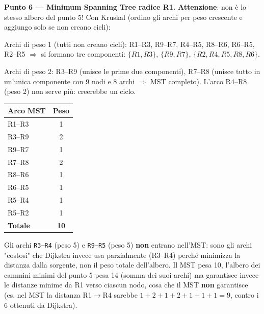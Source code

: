 \documentclass[12pt, a4paper]{article}
\begin{document}
\textbf{Punto 6 --- Minimum Spanning Tree radice R1.} \textbf{Attenzione}: non è lo stesso albero del punto 5! Con Kruskal (ordino gli archi per peso crescente e aggiungo solo se non creano cicli):

Archi di peso 1 (tutti non creano cicli): R1--R3, R9--R7, R4--R5, R8--R6, R6--R5, R2--R5 $\Rightarrow$ si formano tre componenti: $\{R1,R3\}$, $\{R9,R7\}$, $\{R2,R4,R5,R8,R6\}$.

Archi di peso 2: R3--R9 (unisce le prime due componenti), R7--R8 (unisce tutto in un'unica componente con 9 nodi e 8 archi $\Rightarrow$ MST completo). L'arco R4--R8 (peso 2) non serve più: creerebbe un ciclo.

\begin{center}
\begin{tabular}{|l|c|}
\hline
\textbf{Arco MST} & \textbf{Peso} \\
\hline
R1--R3 & 1 \\
R3--R9 & 2 \\
R9--R7 & 1 \\
R7--R8 & 2 \\
R8--R6 & 1 \\
R6--R5 & 1 \\
R5--R4 & 1 \\
R5--R2 & 1 \\
\hline
\textbf{Totale} & \textbf{10} \\
\hline
\end{tabular}
\end{center}

Gli archi \texttt{R3--R4} (peso 5) e \texttt{R9--R5} (peso 5) \textbf{non} entrano nell'MST: sono gli archi "costosi" che Dijkstra invece usa parzialmente (R3--R4) perché minimizza la distanza dalla sorgente, non il peso totale dell'albero. Il MST pesa 10, l'albero dei cammini minimi del punto 5 pesa 14 (somma dei suoi archi) ma garantisce invece le distanze minime da R1 verso ciascun nodo, cosa che il MST \textbf{non} garantisce (es. nel MST la distanza R1$\to$R4 sarebbe $1+2+1+2+1+1+1=9$, contro i 6 ottenuti da Dijkstra).
\end{document}
